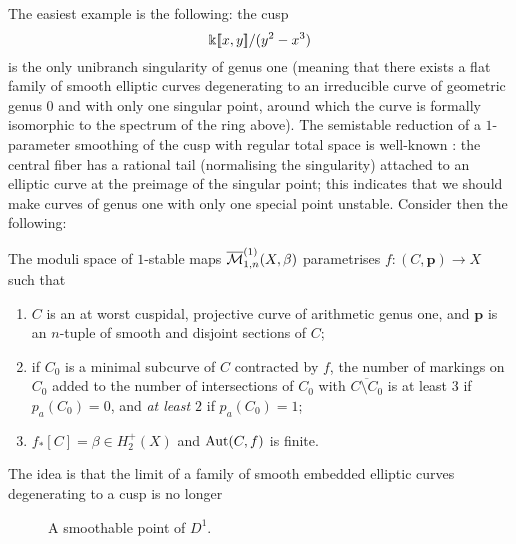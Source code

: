 The easiest example is the following: the cusp
\[\Bbbk[\![x,y]\!]/(y^2-x^3)\]
is the only unibranch singularity of genus one (meaning that there exists a flat family of smooth elliptic curves degenerating to an irreducible curve of geometric genus $0$ and with only one singular point, around which the curve is formally isomorphic to the spectrum of the ring above). The semistable reduction of a $1$-parameter smoothing of the cusp with regular total space is well-known \cite[\S 3.C]{HM}: the central fiber has a rational tail (normalising the singularity) attached to an elliptic curve at the preimage of the singular point; this indicates that we should make curves of genus one with only one special point unstable. Consider then the following:
\begin{dfn}
 The moduli space of $1$-stable maps $\overline{\mathcal M}^{(1)}_{1,n}(X,\beta)$ parametrises $f\colon (C,\mathbf p)\to X$ such that
 \begin{enumerate}
  \item $C$ is an at worst cuspidal, projective curve of arithmetic genus one, and $\mathbf p$ is an $n$-tuple of smooth and disjoint sections of $C$;
  \item if $C_0$ is a minimal subcurve of $C$ contracted by $f$, the number of markings on $C_0$ added to the number of intersections of $C_0$ with $\overline{C\setminus C_0}$ is at least $3$ if $p_a(C_0)=0$, and \emph{at least $2$} if $p_a(C_0)=1$;
  \item $f_*[C]=\beta\in H^+_2(X)$ and $\operatorname{Aut}(C,f)$ is finite.
 \end{enumerate}
\end{dfn}
The idea is that the limit of a family of smooth embedded elliptic curves degenerating to a cusp is no longer
\begin{figure}[h]
\centering
{}
\caption{A smoothable point of $D^1$.}
\end{figure}

